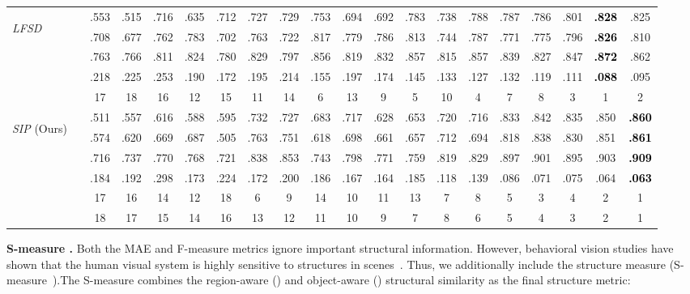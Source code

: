 \documentclass[journal]{IEEEtran}
\newcommand{\fdp}[1]{#1}
\newcommand{\trb}[1]{\textbf{\textcolor{black}{#1}}}
\begin{document}
\begin{table*}[t!]
\begin{tabular}{lr||c|c|c|c|c|c|c|c|c|c|c||c|c|c|c|c|c|c}
    \midrule
\multirow{4}{*}{\begin{sideways}\textit{LFSD}\cite{li2014saliency}\end{sideways}}
    &     & .553 & .515 & .716 & .635  & .712 & .727 & .729& .753 & .694   & .692 & .783 & .738 & .788 & .787  & .786 & .801 & \trb{.828} & .825      \\
&      & .708 & .677 & .762 & .783 & .702 & .763 & .722 & .817 & .779   & .786 & .813 & .744 & .787 & .771  & .775   & .796 & \trb{.826} & .810      \\
&        & .763 & .766 & .811 & .824  & .780 & .829 & .797& .856 & .819   & .832 & .857 & .815 & .857 & .839  & .827   & .847 & \trb{.872} & .862      \\
&  & .218 & .225 & .253 & .190  & .172 & .195 & .214& .155 & .197   & .174 & .145 & .133 & .127 & .132  & .119   & .111 & \trb{.088} & .095\\
\toprule
    &  & 17 & 18 & 16 & 12 & 15 & 11 & 14 & 6 & 13 & 9 & 5 & 10 & 4 & 7 & 8 & 3 & 1 & 2  \\
\midrule
   \multirow{4}{*}{\begin{sideways}\textit{SIP} (Ours)\end{sideways}}
    &     & .511 & .557 & .616 & .588  & .595 & .732 & .727& .683 & .717   & .628 & .653 & .720 & .716 & .833  & .842   & .835 & .850 & \trb{.860}       \\
&      & .574 & .620 & .669 & .687  & .505 & .763 & .751& .618 & .698   & .661 & .657 & .712 & .694 & .818  & .838   & .830 & .851 & \trb{.861}       \\
&        & .716 & .737 & .770 & .768  & .721 & .838 & .853 & .743& .798   & .771 & .759 & .819 & .829 & .897 & .901   & .895 & .903 & \trb{.909}       \\
&  & .184 & .192 & .298 & .173  & .224 & .172 & .200& .186 & .167   & .164 & .185 & .118 & .139 & .086  & .071   & .075 & .064 & \trb{.063}       \\
\toprule
    &   & 17 & 16 & 14 & 12 & 18 & 6 & 9 & 14 & 10 & 11 & 13 & 7 & 8 & 5 & 3 & 4 & 2 & 1  \\
\toprule
&   & 18 & 17 & 15 & 14 & 16 & 13 & 12 & 11 & 10 & 9 & 7 & 8 & 6 & 5 & 4 & 3 & 2 & 1 \\
  \bottomrule
  \hline
  \end{tabular}
\end{table*}

\textbf{S-measure .} Both \fdp{the} MAE and F-measure metrics ignore important \fdp{structural}
information. \fdp{However}, behavioral vision studies have shown that the human visual system
is highly sensitive to structures in scenes~\cite{fan2017structure}.
Thus, we additionally include the structure measure (S-measure~\cite{fan2017structure}).The S-measure combines the region-aware () and
object-aware () structural similarity as \fdp{the} final structure metric:
\end{document}

